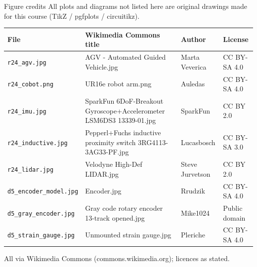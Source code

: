 \documentclass[aspectratio=169,10pt]{beamer}
\begin{document}
\begin{frame}{Figure credits}
\scriptsize
All plots and diagrams not listed here are original drawings made for this course (TikZ / pgfplots / circuitikz).

\vspace{2mm}
\renewcommand{\arraystretch}{1.15}
\begin{tabularx}{\linewidth}{@{}l X l l@{}}
\toprule
\textbf{File} & \textbf{Wikimedia Commons title} & \textbf{Author} & \textbf{License}\\
\midrule
\texttt{r24\_agv.jpg} & AGV - Automated Guided Vehicle.jpg & Marta Veverica & CC BY-SA 4.0\\
\texttt{r24\_cobot.png} & UR16e robot arm.png & Auledas & CC BY-SA 4.0\\
\texttt{r24\_imu.jpg} & SparkFun 6DoF-Breakout Gyroscope+Accelerometer LSM6DS3 13339-01.jpg & SparkFun & CC BY 2.0\\
\texttt{r24\_inductive.jpg} & Pepperl+Fuchs inductive proximity switch 3RG4113-3AG33-PF.jpg & Lucasbosch & CC BY-SA 3.0\\
\texttt{r24\_lidar.jpg} & Velodyne High-Def LIDAR.jpg & Steve Jurvetson & CC BY 2.0\\
\texttt{d5\_encoder\_model.jpg} & Encoder.jpg & Rrudzik & CC BY-SA 4.0\\
\texttt{d5\_gray\_encoder.jpg} & Gray code rotary encoder 13-track opened.jpg & Mike1024 & Public domain\\
\texttt{d5\_strain\_gauge.jpg} & Unmounted strain gauge.jpg & Pleriche & CC BY-SA 4.0\\
\bottomrule
\end{tabularx}

\vspace{1mm}
All via Wikimedia Commons (commons.wikimedia.org); licences as stated.
\end{frame}
\end{document}

